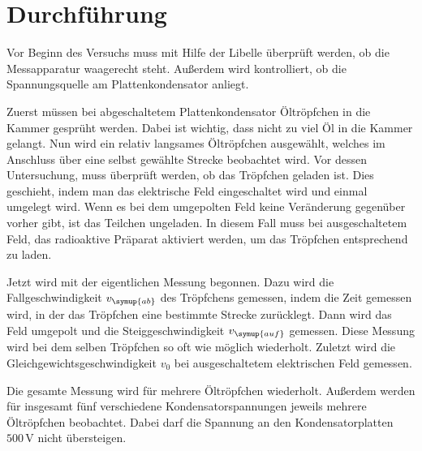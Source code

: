 \section{Durchführung}
\label{sec:Durchführung}

Vor Beginn des Versuchs muss mit Hilfe der Libelle überprüft werden, ob die Messapparatur 
waagerecht steht. Außerdem wird kontrolliert, ob die Spannungsquelle am Plattenkondensator 
anliegt.

Zuerst müssen bei abgeschaltetem Plattenkondensator Öltröpfchen in die Kammer gesprüht 
werden. Dabei ist wichtig, dass nicht zu viel Öl in die Kammer gelangt. Nun wird 
ein relativ langsames Öltröpfchen ausgewählt, welches im Anschluss über eine selbst 
gewählte Strecke beobachtet wird. Vor dessen Untersuchung, muss überprüft werden, ob das 
Tröpfchen geladen ist. Dies geschieht, indem man das elektrische Feld eingeschaltet 
wird und einmal umgelegt wird. Wenn es bei dem umgepolten Feld keine Veränderung gegenüber 
vorher gibt, ist das Teilchen ungeladen. In diesem Fall muss bei ausgeschaltetem 
Feld, das radioaktive Präparat aktiviert werden, um das Tröpfchen entsprechend zu 
laden. 

Jetzt wird mit der eigentlichen Messung begonnen. Dazu wird die Fallgeschwindigkeit $v_{\symup{ab}}$
des Tröpfchens gemessen, indem die Zeit gemessen wird, in der das Tröpfchen 
eine bestimmte Strecke zurücklegt. Dann wird das Feld umgepolt und die 
Steiggeschwindigkeit $v_{\symup{auf}}$ gemessen. Diese Messung wird bei dem selben 
Tröpfchen so oft wie möglich wiederholt. Zuletzt wird die Gleichgewichtsgeschwindigkeit 
$v_0$ bei ausgeschaltetem elektrischen Feld gemessen. 

Die gesamte Messung wird für mehrere Öltröpfchen wiederholt. Außerdem werden für insgesamt 
fünf verschiedene Kondensatorspannungen jeweils mehrere Öltröpfchen beobachtet.
Dabei darf die Spannung an den Kondensatorplatten $500\,\unit{\volt}$ nicht übersteigen.